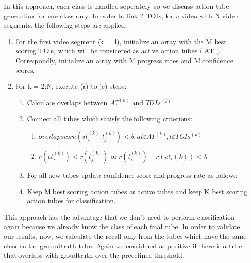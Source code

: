 \documentclass{report}
\begin{document}
In this approach, each class is handled seperately, so we discuss action tube generation for one class only. In order to link 2 TOIs, for
a video with N video segments, the following steps are applied:
\begin{enumerate}
\item For the first video segment (k = 1), initialize an array with the M best scoring TOIs, which will be considered as active action tubes ( AT ).
  Correspondly, initialize an array with M progress rates  and M confidence scores.
\item For k = 2:N, execute (a) to (c) steps:
  \begin{enumerate}
  \item Calculate overlaps between $ AT^{(k)} $ and $ TOIs^{(k)}. $
  \item Connect all tubes which satisfy the following criterions:
    \begin{enumerate}
    \item $ overlap score(at_i^{(k)},t_j^{(k)})   < \theta, 
      at  \varepsilon AT^{(k)}, t \varepsilon TOIs^{(k)}  $
    \item $r(at_i^{(k)}) < r(t_j^{(k)}) $ or 
      $r(t_i^{(k)}) - r(at_i{(k)}) < \lambda $
    \end{enumerate}
    
  \item For all new tubes update confidence score and progress rate as follows:
  \item Keep M best scoring action tubes as active tubes and keep K best scoring action tubes for classification.
  \end{enumerate}
  
\end{enumerate}

This approach has the advantage that we don't need to perform classification again because we already know the class of
each final tube. In order to validate our results, now, we calculate the recall only from the tubes which have the same
class as the groundtruth tube. Again we considered as positive if there is a tube that overlaps with groudtruth over the
predefined threshold. 
\end{document}
